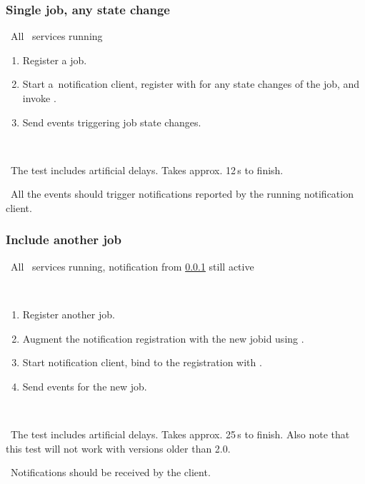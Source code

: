 \subsubsection{Single job, any state change}
\label{notif1}
\req\ All \LB\ services running

\what
\begin{enumerate}
\item Register a job.
\item Start a~notification client,
register with  for any state changes of the job,
and invoke .
\item Send events triggering job state changes.
\end{enumerate}

\how\ 

\note\ The test includes artificial delays. Takes approx. 12\,s to finish.

\result\ All the events should trigger notifications reported by the running
notification client.



\subsubsection{Include another job}
\label{notif2}
\req\ All \LB\ services running, notification from \ref{notif1} still active

\how\
\begin{enumerate}
\item Register another job.
\item Augment the notification registration with the new jobid using
\code{edg\_wll\_NotifChange}.
\item Start notification client, bind to the registration with
.
\item Send events for the new job.
\end{enumerate}

\how\ 

\note\ The test includes artificial delays. Takes approx. 25\,s to finish. Also note that this test will not work with \LB versions older than 2.0.

\result\ Notifications should be received by the client.

